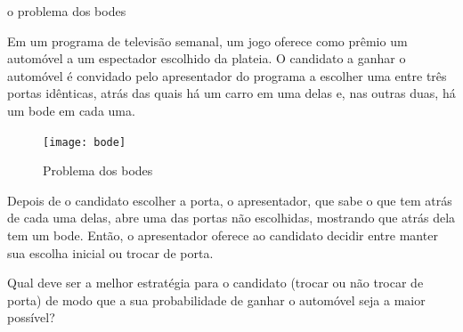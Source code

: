 \label{regrasbasicaspropriedades}\begin{task}{o problema dos bodes}


Em um programa de televisão semanal, um jogo oferece como prêmio um automóvel a um espectador escolhido da plateia. O candidato a ganhar o automóvel é convidado pelo apresentador do programa a escolher uma entre três portas idênticas, atrás das quais há um carro em uma delas e, nas outras duas, há um bode em cada uma.

\begin{figure}[H]
\centering

\noindent\texttt{[image: bode]}
\caption{Problema dos bodes}
\end{figure}


Depois de o candidato escolher a porta, o apresentador, que sabe o que tem atrás de cada uma delas, abre uma das portas não escolhidas, mostrando que atrás dela tem um bode. Então, o apresentador oferece ao candidato decidir entre manter sua escolha inicial ou trocar de porta.

Qual deve ser a melhor estratégia para o candidato (trocar ou não trocar de porta) de modo que a sua probabilidade de ganhar o automóvel seja a maior possível?
\end{task}
